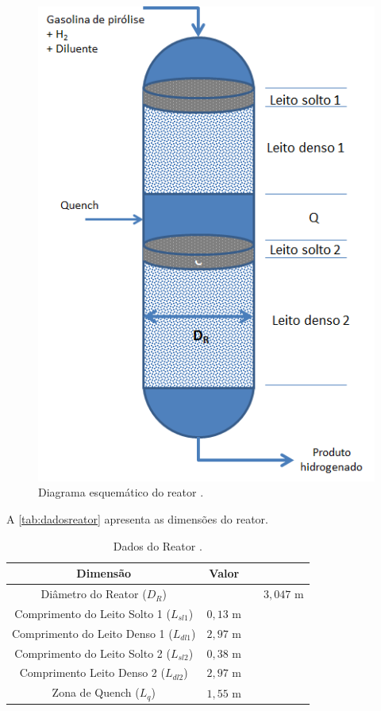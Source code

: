 \begin{figure}[htb]
\centering \includegraphics[scale=0.75]{images/Chap3/esquemareator.png}
\caption{Diagrama esquemático do reator \cite{Rojas2014a}.}
\label{fig:esquemareator}
\end{figure}

A \autoref{tab:dadosreator} apresenta as dimensões do reator.

\begin{table}[!htb]
\begin{center}
\caption{Dados do Reator \cite{Rojas2014a}.}
\label{tab:dadosreator}
\small
\begin{tabular}{cc}
{Dimensão} & {Valor}
\\
\hline
{Diâmetro do Reator ($D_R$)} & & & $3,047$ m \\
{Comprimento do Leito Solto 1 ($L_{sl1}$)} & $0,13$ m \\
{Comprimento do Leito Denso 1 ($L_{dl1}$)} & $2,97$ m \\
{Comprimento do Leito Solto 2 ($L_{sl2}$)} & $0,38$ m \\
{Comprimento Leito Denso 2 ($L_{dl2}$)} & $2,97$ m \\
{Zona de Quench ($L_{q}$)} & $1,55$ m \\
\bottomrule
\end{tabular}
\end{center}
\end{table}

